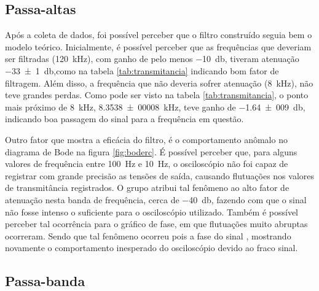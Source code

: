 
\subsection{Passa-altas}

  Após a coleta de dados, foi possível perceber que o filtro construído seguia bem o modelo teórico. Inicialmente, é possível perceber que as frequências que deveriam ser filtradas (\SI{120}{\kilo\hertz}), com ganho de pelo menos \SI{-10}{\decibel}, tiveram atenuação \SI{-33(1)}{\decibel},como na tabela \ref{tab:transmitancia} indicando bom fator de filtragem. Além disso, a frequência que não deveria sofrer atenuação (\SI{8}{\kilo\hertz}), não teve grandes perdas. Como pode ser visto na tabela \ref{tab:transmitancia}, o ponto mais próximo de \SI{8}{\kilo\hertz}, \SI{8,3538(00008)}{\kilo\hertz}, teve ganho de \SI{-1,64(009)}{\decibel}, indicando boa passagem do sinal para a frequência em questão.\par
  Outro fator que mostra a eficácia do filtro, é o comportamento anômalo no diagrama de Bode na figura \ref{fig:boderc}. É possível perceber que, para alguns valores de frequência entre \SI{100}{\hertz} e \SI{10}{\hertz}, o osciloscópio não foi capaz de registrar com grande precisão as tensões de saída, causando flutuações nos valores de transmitância registrados. O grupo atribui tal fenômeno ao alto fator de atenuação nesta banda de frequência, cerca de \SI{-40}{\decibel}, fazendo com que o sinal não fosse intenso o suficiente para o osciloscópio utilizado. Também é possível perceber tal ocorrência para o gráfico de fase, em que flutuações muito abruptas ocorreram. Sendo que tal fenômeno ocorreu pois a fase do sinal 
  , mostrando novamente o comportamento inesperado do osciloscópio devido ao fraco sinal.
  \pagebreak
  
  \subsection{Passa-banda}